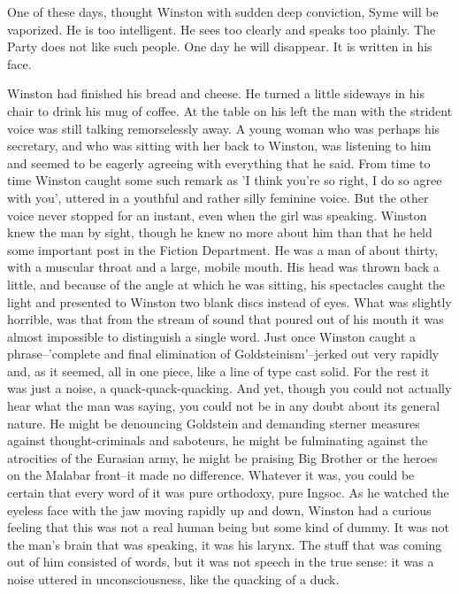 \documentclass{article}
\begin{document}
One of these days, thought Winston with sudden deep conviction, Syme will
be vaporized. He is too intelligent. He sees too clearly and speaks too
plainly. The Party does not like such people. One day he will disappear.
It is written in his face.

Winston had finished his bread and cheese. He turned a little sideways
in his chair to drink his mug of coffee. At the table on his left the man
with the strident voice was still talking remorselessly away. A young
woman who was perhaps his secretary, and who was sitting with her back
to Winston, was listening to him and seemed to be eagerly agreeing with
everything that he said. From time to time Winston caught some such remark
as 'I think you're so right, I do so agree with you', uttered in a youthful
and rather silly feminine voice. But the other voice never stopped for an
instant, even when the girl was speaking. Winston knew the man by sight,
though he knew no more about him than that he held some important post
in the Fiction Department. He was a man of about thirty, with a muscular
throat and a large, mobile mouth. His head was thrown back a little, and
because of the angle at which he was sitting, his spectacles caught the
light and presented to Winston two blank discs instead of eyes. What was
slightly horrible, was that from the stream of sound that poured out of
his mouth it was almost impossible to distinguish a single word. Just
once Winston caught a phrase--'complete and final elimination of
Goldsteinism'--jerked out very rapidly and, as it seemed, all in one piece,
like a line of type cast solid. For the rest it was just a noise, a
quack-quack-quacking. And yet, though you could not actually hear what the
man was saying, you could not be in any doubt about its general nature.
He might be denouncing Goldstein and demanding sterner measures against
thought-criminals and saboteurs, he might be fulminating against the
atrocities of the Eurasian army, he might be praising Big Brother or the
heroes on the Malabar front--it made no difference. Whatever it was, you
could be certain that every word of it was pure orthodoxy, pure Ingsoc.
As he watched the eyeless face with the jaw moving rapidly up and down,
Winston had a curious feeling that this was not a real human being but
some kind of dummy. It was not the man's brain that was speaking, it was
his larynx. The stuff that was coming out of him consisted of words, but
it was not speech in the true sense: it was a noise uttered in
unconsciousness, like the quacking of a duck.
\end{document}
